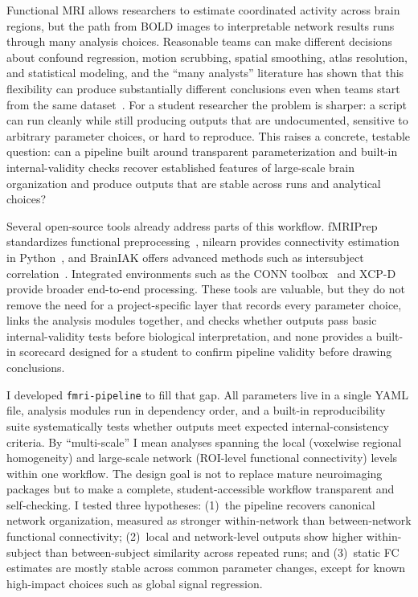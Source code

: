\documentclass[12pt]{article}
\begin{document}
Functional MRI allows researchers to estimate coordinated activity
across brain regions, but the path from BOLD images to interpretable
network results runs through many analysis choices. Reasonable teams can
make different decisions about confound regression, motion scrubbing,
spatial smoothing, atlas resolution, and statistical modeling, and the
``many analysts'' literature has shown that this flexibility can produce
substantially different conclusions even when teams start from the same
dataset~\citep{botvinik2020variability}. For a student researcher the
problem is sharper: a script can run cleanly while still producing
outputs that are undocumented, sensitive to arbitrary parameter choices,
or hard to reproduce. This raises a concrete, testable question: can a
pipeline built around transparent parameterization and built-in
internal-validity checks recover established features of large-scale
brain organization and produce outputs that are stable across runs and
analytical choices?

Several open-source tools already address parts of this workflow.
fMRIPrep standardizes functional
preprocessing~\citep{esteban2019fmriprep}, nilearn provides
connectivity estimation in Python~\citep{abraham2014machine}, and
BrainIAK offers advanced methods such as intersubject
correlation~\citep{kumar2021brainiak}. Integrated environments such as
the CONN toolbox~\citep{whitfield2012conn} and
XCP-D~\citep{mehta2024xcpd} provide broader end-to-end processing.
These tools are valuable, but they do not remove the need for a
project-specific layer that records every parameter choice, links the
analysis modules together, and checks whether outputs pass basic
internal-validity tests before biological interpretation, and none
provides a built-in scorecard designed for a student to confirm pipeline
validity before drawing conclusions.

I developed \texttt{fmri-pipeline} to fill that gap. All parameters
live in a single YAML file, analysis modules run in dependency order,
and a built-in reproducibility suite systematically tests whether
outputs meet expected internal-consistency criteria. By ``multi-scale''
I mean analyses spanning the local (voxelwise regional homogeneity) and
large-scale network (ROI-level functional connectivity) levels within
one workflow. The design goal is not to replace mature neuroimaging
packages but to make a complete, student-accessible workflow transparent
and self-checking. I tested three hypotheses: (1)~the pipeline recovers
canonical network organization, measured as stronger within-network than
between-network functional connectivity; (2)~local and network-level
outputs show higher within-subject than between-subject similarity
across repeated runs; and (3)~static FC estimates are mostly stable
across common parameter changes, except for known high-impact choices
such as global signal regression.
\end{document}
